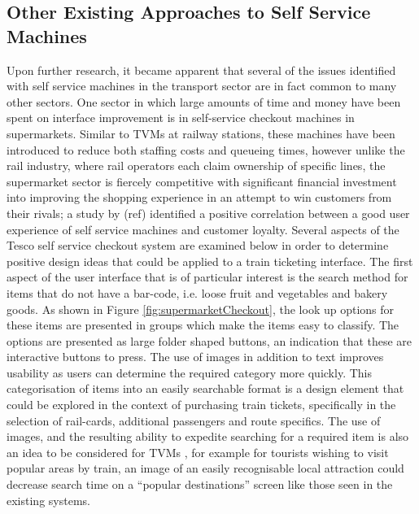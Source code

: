 \subsection{Other Existing Approaches to Self Service Machines}
Upon further research, it became apparent that several of the issues identified with self service machines in the transport sector are in fact common to many other sectors. One sector in which large amounts of time and money have been spent on interface improvement is in self-service checkout machines in supermarkets. Similar to TVMs at railway stations, these machines have been introduced to reduce both staffing costs and queueing times, however unlike the rail industry, where rail operators each claim ownership of specific lines, the supermarket sector is fiercely competitive with significant financial investment into improving the shopping experience in an attempt to win customers from their rivals; a study by (ref) identified a positive correlation between a good user experience of self service machines and customer loyalty. Several aspects of the Tesco self service checkout system are examined below in order to determine positive design ideas that could be applied to a train ticketing interface. The first aspect of the user interface that is of particular interest is the search method for items that do not have a bar-code, i.e. loose fruit and vegetables and bakery goods. As shown in Figure \ref{fig:supermarketCheckout}, the look up options for these items are presented in groups which make the items easy to classify. The options are presented as large folder shaped buttons, an indication that these are interactive buttons to press. The use of images in addition to text improves usability as users can determine the required category more quickly. This categorisation of items into an easily searchable format is a design element that could be explored in the context of purchasing train tickets, specifically in the selection of rail-cards, additional passengers and route specifics. The use of images, and the resulting ability to expedite searching for a required item is also an idea to be considered for TVMs , for example for tourists wishing to visit popular areas by train, an image of an easily recognisable local attraction could decrease search time on a “popular destinations” screen like those seen in the existing systems.


